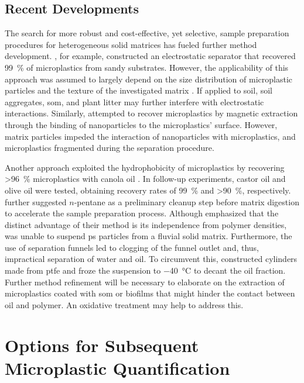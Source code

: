 \subsection{Recent Developments}
\label{sec:analytical-techniques:recent-developments}

The search for more robust and cost-effective, yet selective, sample preparation procedures for heterogeneous solid matrices has fueled further method development. , for example, constructed an electrostatic separator that recovered \SI{99}{\percent} of microplastics from sandy substrates. However, the applicability of this approach was assumed to largely depend on the size distribution of microplastic particles and the texture of the investigated matrix \citep{EndersEvaluation2020}. If applied to soil, soil aggregates, \ac{som}, and plant litter may further interfere with electrostatic interactions.
Similarly, \citet{GrbicMagnetic2019} attempted to recover microplastics by magnetic extraction through the binding of  nanoparticles to the microplastics' surface. However, matrix particles impeded the interaction of nanoparticles with microplastics, and microplastics fragmented during the separation procedure.

Another approach exploited the hydrophobicity of microplastics by recovering \SI{>96}{\percent} microplastics with canola oil \citep{CrichtonNovel2017}. In follow-up experiments, castor oil \citep{ManiUsing2019} and olive oil \citep{ScopetaniOlive2020} were tested, obtaining recovery rates of \SI{99}{\percent} and \SI{>90}{\percent}, respectively.  further suggested $n$-pentane as a preliminary cleanup step before matrix digestion to accelerate the sample preparation process. Although \citet{ScopetaniOlive2020} emphasized that the distinct advantage of their method is its independence from polymer densities, \citet{ManiUsing2019} was unable to suspend \ac{ps} particles from a fluvial solid matrix. Furthermore, the use of separation funnels led to clogging of the funnel outlet and, thus, impractical separation of water and oil. To circumvent this, \citet{ScopetaniOlive2020} constructed cylinders made from \ac{ptfe} and froze the suspension to \SI{-40}{\degreeCelsius} to decant the oil fraction. Further method refinement will be necessary to elaborate on the extraction of microplastics coated with \ac{som} or biofilms that might hinder the contact between oil and polymer. An oxidative treatment may help to address this.

\section{Options for Subsequent Microplastic Quantification}
\label{sec:analytical-techniques:analysis}

